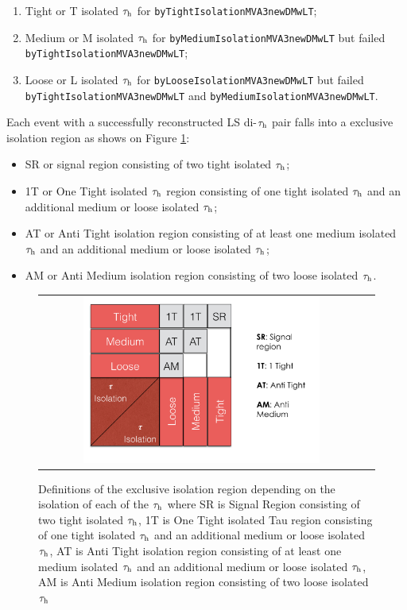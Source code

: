  	\begin{enumerate}
 		\item Tight or T isolated $\tau_{\text{h}}$ for \texttt{byTight\-IsolationMVA3newDMwLT};
 		\item Medium or M isolated $\tau_{\text{h}}$ for \texttt{byMedium\-IsolationMVA3newDMwLT} but failed \texttt{byTight\-IsolationMVA3newDMwLT};
 		\item Loose or L isolated $\tau_{\text{h}}$  for \texttt{byLoose\-IsolationMVA3newDMwLT} but failed \texttt{byTight\-IsolationMVA3newDMwLT} and \texttt{byMedium\-IsolationMVA3newDMwLT}.
 	\end{enumerate}
 	
Each event with a successfully reconstructed LS di-$\tau_{\text{h}}$ pair falls into a exclusive isolation region as shows on Figure \ref{fig:tauisoregions}:
 	
 	\begin{itemize}
 		\item SR or signal region consisting of two tight isolated $\tau_{\text{h}}$;
 		\item 1T or One Tight isolated $\tau_{\text{h}}$ region consisting of one tight isolated $\tau_{\text{h}}$ and an additional medium or loose isolated $\tau_{\text{h}}$;
 		\item AT or Anti Tight isolation region consisting of at least one medium isolated $\tau_{\text{h}}$ and an additional medium or loose isolated $\tau_{\text{h}}$;
 		\item AM or Anti Medium isolation region consisting of two loose isolated $\tau_{\text{h}}$.
 	\end{itemize}
 
 	\begin{figure}[tbh!]
 		\centering
 		\begin{tabular}{cc}
 			\includegraphics[width=0.75\textwidth]{PLOTS/diTauHadLSotherPlots/tauisoregions.png}
 		\end{tabular}
 		\caption{Definitions of the exclusive isolation region depending on the isolation of each of the $\tau_{\text{h}}$ where SR is Signal Region consisting of two tight isolated $\tau_{\text{h}}$, 1T is One Tight isolated Tau region consisting of one tight isolated $\tau_{\text{h}}$ and an additional medium or loose isolated $\tau_{\text{h}}$, AT is Anti Tight isolation region consisting of at least one medium isolated $\tau_{\text{h}}$ and an additional medium or loose isolated $\tau_{\text{h}}$,  AM is Anti Medium isolation region consisting of two loose isolated $\tau_{\text{h}}$}
 		\label{fig:tauisoregions}
 	\end{figure}
 
